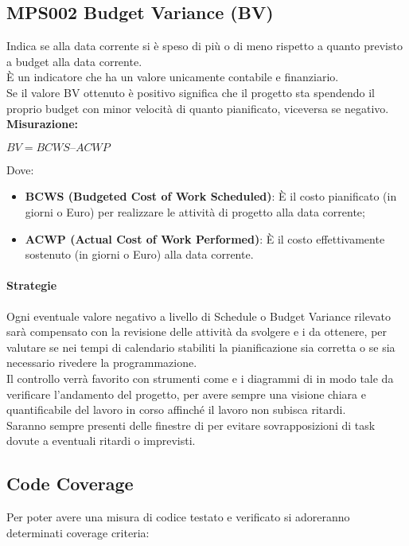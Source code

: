 \documentclass[NormeDiProgetto.tex]{subfiles}
\begin{document}
\subsection {MPS002 Budget Variance (BV)}
Indica se alla data corrente si è speso di più o di meno rispetto a quanto previsto a budget alla data corrente.\\
È un indicatore che ha un valore unicamente contabile e finanziario.\\
Se il valore BV ottenuto è positivo significa che il progetto sta spendendo il proprio budget con minor velocità di quanto pianificato, viceversa se negativo.\\
\textbf{Misurazione:}
\begin{center}
	$ BV = BCWS – ACWP $
\end{center}
Dove: \begin{itemize}
	\item \textbf{BCWS (Budgeted Cost of Work Scheduled)}: \`{E} il costo pianificato (in giorni o Euro) per realizzare le attività di progetto alla data corrente;
	\item \textbf{ACWP (Actual Cost of Work Performed)}: \`{E} il costo effettivamente sostenuto (in giorni o Euro) alla data corrente.
\end{itemize}

\paragraph{Strategie}
Ogni eventuale valore negativo a livello di Schedule o Budget Variance rilevato sarà compensato con la revisione delle attività da svolgere e i  da ottenere, per valutare se nei tempi di calendario stabiliti la pianificazione sia corretta o se sia necessario rivedere la programmazione.\\
Il controllo verrà favorito con strumenti come  e i diagrammi di  in modo tale da verificare l'andamento del progetto, per avere sempre una visione chiara e quantificabile del lavoro in corso affinché il lavoro non subisca ritardi.\\
Saranno sempre presenti delle finestre di  per evitare sovrapposizioni di task dovute a eventuali ritardi o imprevisti. 

\subsection{Code Coverage}
Per poter avere una misura di codice testato e verificato si adoreranno determinati coverage criteria:
\end{document}

